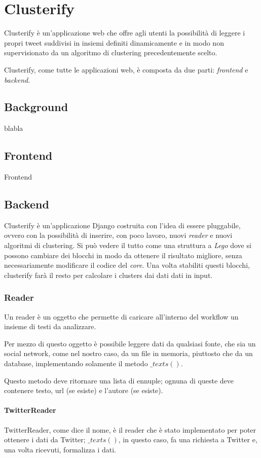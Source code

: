 \chapter{Clusterify}
	Clusterify è un'applicazione web che offre agli utenti la possibilità di leggere i propri tweet suddivisi in insiemi definiti dinamicamente e in modo non supervisionato da un algoritmo di clustering precedentemente scelto.

	Clusterify, come tutte le applicazioni web, è composta da due parti: \emph{frontend} e \emph{backend}.

\section{Background}
	blabla
	
	

\section{Frontend}
	Frontend

\section{Backend}
	Clusterify è un'applicazione Django\cite{django_project} costruita con l'idea di essere pluggabile, ovvero con la possibilità di inserire, con poco lavoro, nuovi \emph{reader} e nuovi algoritmi di clustering. Si può vedere il tutto come una struttura a \emph{Lego} dove si possono cambiare dei blocchi in modo da ottenere il risultato migliore, senza necessariamente modificare il codice del \emph{core}. Una volta stabiliti questi blocchi, clusterify farà il resto per calcolare i clusters dai dati dati in input.

	\subsection{Reader}
		Un reader è un oggetto che permette di caricare all'interno del workflow un insieme di testi da analizzare.

		Per mezzo di questo oggetto è possibile leggere dati da qualsiasi fonte, che sia un social network, come nel nostro caso, da un file in memoria, piuttosto che da un database, implementando solamente il metodo $\_texts()$.

		Questo metodo deve ritornare una lista di ennuple; ognuna di queste deve contenere testo, url (se esiste) e l'autore (se esiste).

		\subsubsection{TwitterReader}
			TwitterReader, come dice il nome, è il reader che è stato implementato per poter ottenere i dati da Twitter; $\_texts()$, in questo caso, fa una richiesta a Twitter e, una volta ricevuti, formalizza i dati.

